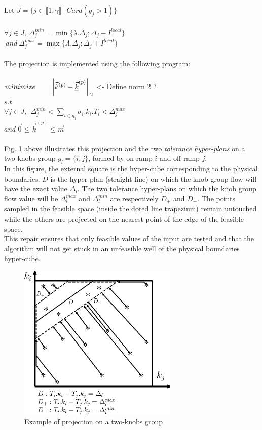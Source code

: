 Let $J=\{j\in \llbracket 1,\gamma \rrbracket\ |\ Card(g_{j}>1)\}$\\
\\
$\forall j\in J,\ \Delta_{j}^{min}=\min{\{\lambda.\Delta_{j};\Delta_{j}-I^{local}\}}$\\
$\ and\ \Delta_{j}^{max}=\max{\{\Lambda.\Delta_{j};\Delta_{j}+I^{local}\}}$\\
\\
The projection is implemented using the following program:\\
\\
$minimize \ \ \ \ \ \ \norm{\vec{k}^{(p)}-\underline{\vec{k}}^{(p)}}_{2}$\color{red} <- Define norm 2 ?\color{black}\\
$s.t.$\\
$\forall j\in{J}, \ \ \Delta_{j}^{min}< \sum_{i\in{g_{j}}} \sigma_{i}.k_{i}.T_{i}<\Delta_{j}^{max}$\\
$and\ \vec{0} \leq \vec{k}^{(p)} \leq \vec{m}$\\
\\
Fig. \ref{fig:proj} above illustrates this projection and the two \emph{tolerance hyper-plans} on a two-knobs group $g_{l}=\{i,j\}$, formed by on-ramp $i$ and off-ramp $j$.\\
In this figure, the external square is the hyper-cube corresponding to the physical boundaries. 
$D$ is the hyper-plan (straight line) on which the knob group flow will have the exact value $\Delta_{l}$.
The two tolerance hyper-plans on which the knob group flow value will be $\Delta_{l}^{max}$ and $\Delta_{l}^{min}$ are respectively $D_{+}$ and $D_{-}$. The points sampled in the feasible space (inside the doted line trapezium) remain untouched while the others are projected on the nearest point of the edge of the feasible space.\\
This repair ensures that only feasible values of the input are tested and that the algorithm will not get stuck in an unfeasible well of the physical boundaries hyper-cube.\\
\begin{figure}
\centering
\includegraphics[width=3in]{figures/proj.eps}
\caption{Example of projection on a two-knobs group}
\label{fig:proj}
\end{figure}
